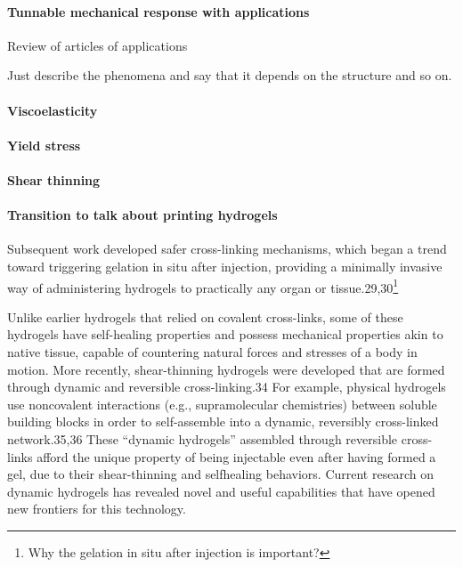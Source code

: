 \paragraph{Tunnable mechanical response with applications} Review of articles of applications 



Just describe the phenomena and say that it depends on the structure and so on.

\paragraph{Viscoelasticity}

\paragraph{Yield stress}

\paragraph{Shear thinning}


\paragraph{Transition to talk about printing hydrogels}\citep{correaTranslationalApplicationsHydrogels2021}
Subsequent work developed safer cross-linking mechanisms, which began a trend toward triggering gelation in situ after injection, providing a minimally invasive way of administering  hydrogels to practically any organ or tissue.29,30\footnote{Why the gelation in situ after injection is important?}

Unlike earlier hydrogels that relied on covalent cross-links, some of these hydrogels have self-healing properties and possess mechanical properties akin to native tissue, capable of countering natural forces and stresses of a body in motion.
More recently, shear-thinning hydrogels were developed that are formed through dynamic and reversible cross-linking.34 
For example, physical hydrogels use noncovalent interactions (e.g., supramolecular chemistries) between soluble building blocks in order to self-assemble into a dynamic, reversibly cross-linked  network.35,36 
These “dynamic hydrogels” assembled through reversible cross-links afford the unique property of being injectable even after having formed a gel, due to their shear-thinning and selfhealing behaviors. 
Current research on dynamic hydrogels has revealed novel and useful capabilities that have opened new frontiers for this technology. 

